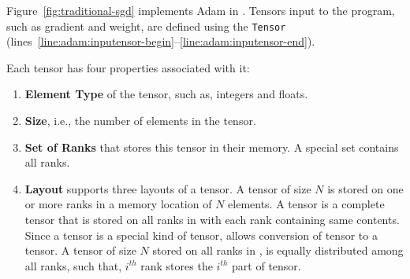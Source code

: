 Figure~\ref{fig:traditional-sgd} implements  Adam in \tool.
Tensors input to the program, such as gradient and weight, are defined 
using the \texttt{Tensor} (lines~\ref{line:adam:inputensor-begin}--\ref{line:adam:inputensor-end}).

Each tensor has four properties associated with it:
\begin{enumerate}
        \item \textbf{Element Type} of the tensor, such as, integers and floats.
        \item \textbf{Size}, i.e., the number of elements in the tensor.
        \item \textbf{Set of Ranks} that stores this tensor in their memory. 
        A special set \WORLD contains all ranks.
        \item \textbf{Layout} \tool supports three layouts of a tensor.
        A \emph{\complete{}} tensor of size $N$ is stored on one or more ranks in a memory location of $N$ elements.
        A \emph{\replicated} tensor is a complete tensor that is stored on all ranks in \WORLD with each rank containing same contents.
        Since a \replicated tensor is a special kind of \complete tensor, \tool allows conversion of \replicated tensor to a \complete tensor.
        A \emph{\sliced{}} tensor of size $N$ stored on all ranks in \WORLD, is equally distributed among all ranks, such that, $i^{th}$ rank stores the $i^{th}$ part of tensor.
\end{enumerate}


